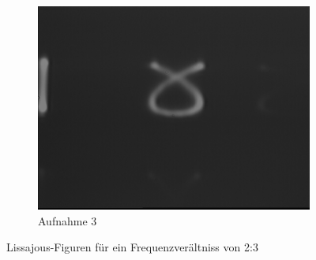 \documentclass[bigchapter,colorback,accentcolor=tud4b,linedtoc,11pt]{tudreport}
\begin{document}
\begin{figure}[H]
\begin{subfigure}[h]{0.32\textwidth}
    \includegraphics[width=\textwidth]{data/Aufgabe7/2-3-y.png}
    \caption[Cap for listoffigures]{Aufnahme 3}
  \end{subfigure}%
  \caption{Lissajous-Figuren für ein Frequenzverältniss von 2:3}
\end{figure}
\end{document}
